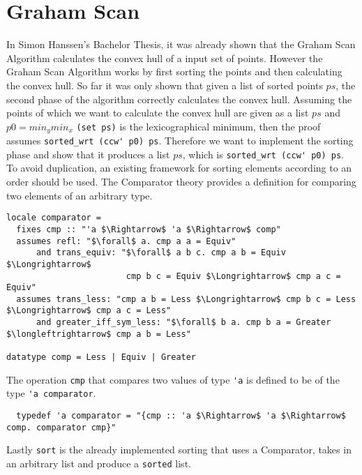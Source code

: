 


\section{Graham Scan}
In Simon Hanssen's Bachelor Thesis, it was already shown that the Graham Scan Algorithm
calculates the convex hull of a input set of points. 
However the Graham Scan Algorithm works by first sorting the points and then 
calculating the convex hull. So far it was only shown that given a list of
sorted points $ps$, the second phase of the algorithm correctly calculates
the convex hull. Assuming the points of which we want to calculate
the convex hull are given as a list $ps$ and $p0 = min_y min_x$ \lstinline|(set ps)| is the 
lexicographical minimum, then the proof assumes \lstinline|sorted_wrt (ccw' p0) ps|. 
Therefore we want to implement the sorting phase and show that it produces a list $ps$,
which is \lstinline|sorted_wrt (ccw' p0) ps|. To avoid duplication, an existing framework
for sorting elements according to an order should be used. The Comparator theory provides
a definition for comparing two elements of an arbitrary type.
\begin{lstlisting}
locale comparator =
  fixes cmp :: "'a $\Rightarrow$ 'a $\Rightarrow$ comp"
  assumes refl: "$\forall$ a. cmp a a = Equiv"
      and trans_equiv: "$\forall$ a b c. cmp a b = Equiv $\Longrightarrow$ 
                        cmp b c = Equiv $\Longrightarrow$ cmp a c = Equiv"
  assumes trans_less: "cmp a b = Less $\Longrightarrow$ cmp b c = Less $\Longrightarrow$ cmp a c = Less"
      and greater_iff_sym_less: "$\forall$ b a. cmp b a = Greater $\longleftrightarrow$ cmp a b = Less"

datatype comp = Less | Equiv | Greater

\end{lstlisting} 
The operation \lstinline|cmp| that compares two values of type \lstinline|'a| is defined
to be of the type \lstinline|'a comparator|.
\begin{lstlisting}
  typedef 'a comparator = "{cmp :: 'a $\Rightarrow$ 'a $\Rightarrow$ comp. comparator cmp}"
\end{lstlisting}
Lastly \lstinline|sort| is the already implemented sorting that uses a Comparator,
takes in an arbitrary list and produce a \lstinline|sorted| list.
